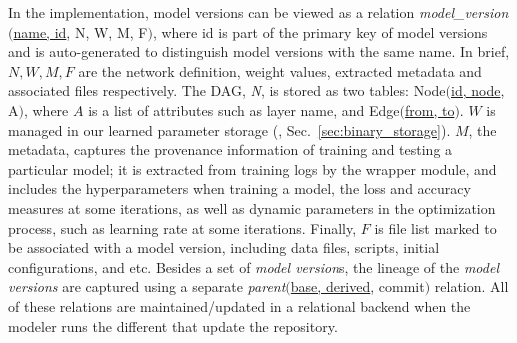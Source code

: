 \documentclass[conference]{IEEEtran}
\begin{document}
In the implementation, model versions can be viewed as a relation \emph{model\_version}$($\underline{name, id}, N, W, M,
        F$)$, where id is part of the primary key of model versions and is auto-generated to
distinguish model versions with the same name. In brief, $N, W, M, F$ are the network definition,
            weight values, extracted metadata and associated files respectively. The DAG, \emph{N},
            is stored as two tables: Node$($\underline{id, node}, A$)$, where $A$ is a list of
            attributes such as layer name, and Edge$($\underline{from, to}$)$. $W$ is managed in our learned parameter storage (\weightstore, Sec.~\ref{sec:binary_storage}). $M$, the metadata, captures the provenance information of training and testing a particular model; it is extracted from training logs by the wrapper module, and includes the hyperparameters when training a model, the loss and accuracy measures at some iterations, as well as dynamic parameters in the optimization process, such as learning rate at some iterations. Finally, $F$ is file list marked to be associated with a model version, including data files, scripts, initial configurations, and etc.
            Besides a set of \emph{model version}s, the lineage of the \emph{model versions} are captured using a
            separate \emph{parent}$($\underline{base, derived}, commit$)$ relation. All of these relations are maintained/updated in a relational backend when
            the modeler runs the different \dlv\commands that update the repository.


\end{document}
